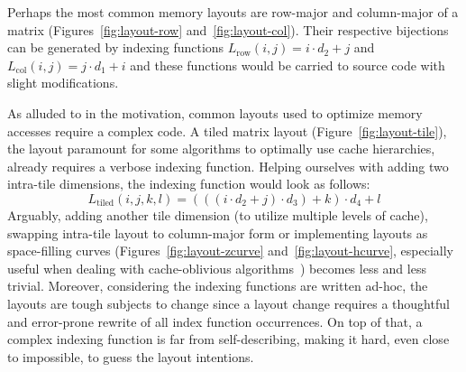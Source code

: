 Perhaps the most common memory layouts are row-major and column-major of a matrix (Figures~\ref{fig:layout-row} and~\ref{fig:layout-col}). Their respective bijections can be generated by indexing functions $L_{\text{row}}(i,j) = i \cdot d_2 + j$ and $L_{\text{col}}(i,j) = j \cdot d_1 + i$ and these functions would be carried to source code with slight modifications. 

As alluded to in the motivation, common layouts used to optimize memory accesses require a complex code. A tiled matrix layout (Figure~\ref{fig:layout-tile}), the layout paramount for some algorithms to optimally use cache hierarchies, already requires a verbose indexing function. Helping ourselves with adding two intra-tile dimensions, the indexing function would look as follows:
$$L_{\text{tiled}}(i,j,k,l) = (((i \cdot d_2 + j) \cdot d_3) + k) \cdot d_4 + l$$
Arguably, adding another tile dimension (to utilize multiple levels of cache), swapping intra-tile layout to column-major form or implementing layouts as space-filling curves (Figures~\ref{fig:layout-zcurve} and~\ref{fig:layout-hcurve}, especially useful when dealing with cache-oblivious algorithms~\cite{bader2006cache}) becomes less and less trivial. Moreover, considering the indexing functions are written ad-hoc, the layouts are tough subjects to change since a layout change requires a thoughtful and error-prone rewrite of all index function occurrences. On top of that, a complex indexing function is far from self-describing, making it hard, even close to impossible, to guess the layout intentions.

